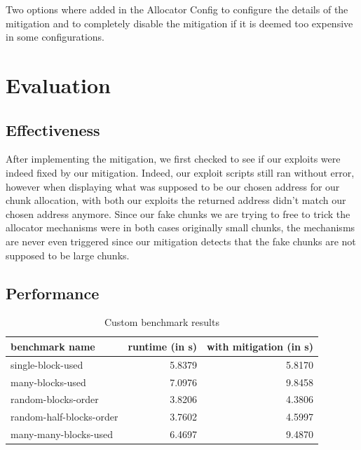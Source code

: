 \documentclass[a4paper,11pt,oneside]{report}
\begin{document}
Two options where added in the Allocator Config to configure the details of the mitigation
and to completely disable the mitigation if it is deemed too expensive in some
configurations.

\section{Evaluation}

\subsection{Effectiveness}

After implementing the mitigation, we first checked to see if our exploits were indeed
fixed by our mitigation. Indeed, our exploit scripts still ran without error, however when
displaying what was supposed to be our chosen address for our chunk allocation, with both
our exploits the returned address didn't match our chosen address anymore. Since our fake
chunks we are trying to free to trick the allocator mechanisms were in both cases
originally small chunks, the mechanisms are never even triggered since our mitigation
detects that the fake chunks are not supposed to be large chunks.

\subsection{Performance}

\begin{longtable}[h]{l r r}
  \caption{Custom benchmark results}\label{tab:CustomBenchmark} \\
  
  \toprule
  benchmark name           & runtime (in s) & with mitigation (in s) \\
  \midrule
  \endhead{}
  single-block-used        & 5.8379         & 5.8170                 \\
  \midrule
  many-blocks-used         & 7.0976         & 9.8458                 \\
  \midrule
  random-blocks-order      & 3.8206         & 4.3806                 \\
  \midrule
  random-half-blocks-order & 3.7602         & 4.5997                 \\
  \midrule
  many-many-blocks-used    & 6.4697         & 9.4870                 \\
  \bottomrule
\end{longtable}
\end{document}
